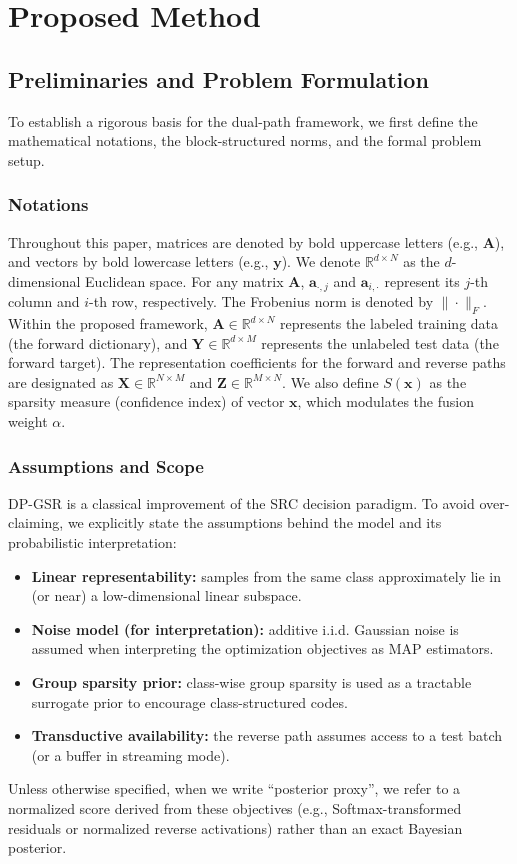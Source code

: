 \documentclass[10pt,comsoc]{IEEEtran}
\begin{document}
\section{Proposed Method}

\subsection{Preliminaries and Problem Formulation}
To establish a rigorous basis for the dual-path framework, we first define the mathematical notations, the block-structured norms, and the formal problem setup.

\subsubsection{Notations}
Throughout this paper, matrices are denoted by bold uppercase letters (e.g., $\mathbf{A}$), and vectors by bold lowercase letters (e.g., $\mathbf{y}$). We denote $\mathbb{R}^{d \times N}$ as the $d$-dimensional Euclidean space. For any matrix $\mathbf{A}$, $\mathbf{a}_{\cdot, j}$ and $\mathbf{a}_{i, \cdot}$ represent its $j$-th column and $i$-th row, respectively. The Frobenius norm is denoted by $\|\cdot\|_F$. Within the proposed framework, $\mathbf{A} \in \mathbb{R}^{d \times N}$ represents the labeled training data (the forward dictionary), and $\mathbf{Y} \in \mathbb{R}^{d \times M}$ represents the unlabeled test data (the forward target). The representation coefficients for the forward and reverse paths are designated as $\mathbf{X} \in \mathbb{R}^{N \times M}$ and $\mathbf{Z} \in \mathbb{R}^{M \times N}$. We also define $S(\mathbf{x})$ as the sparsity measure (confidence index) of vector $\mathbf{x}$, which modulates the fusion weight $\alpha$.

\subsubsection{Assumptions and Scope}
DP-GSR is a classical improvement of the SRC decision paradigm. To avoid over-claiming, we explicitly state the assumptions behind the model and its probabilistic interpretation:
\begin{itemize}
    \item \textbf{Linear representability:} samples from the same class approximately lie in (or near) a low-dimensional linear subspace.
    \item \textbf{Noise model (for interpretation):} additive i.i.d. Gaussian noise is assumed when interpreting the optimization objectives as MAP estimators.
    \item \textbf{Group sparsity prior:} class-wise group sparsity is used as a tractable surrogate prior to encourage class-structured codes.
    \item \textbf{Transductive availability:} the reverse path assumes access to a test batch (or a buffer in streaming mode).
\end{itemize}
Unless otherwise specified, when we write ``posterior proxy'', we refer to a normalized score derived from these objectives (e.g., Softmax-transformed residuals or normalized reverse activations) rather than an exact Bayesian posterior.
\end{document}

